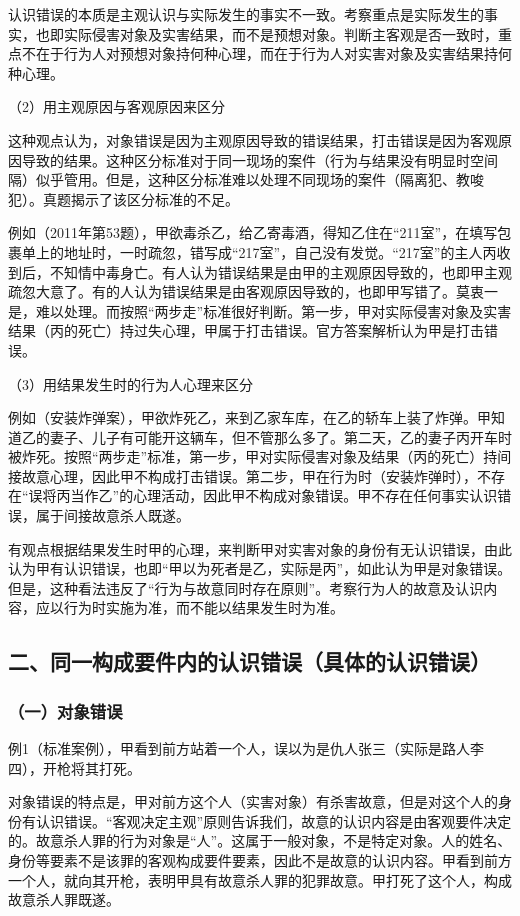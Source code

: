认识错误的本质是主观认识与实际发生的事实不一致。考察重点是实际发生的事实，也即实际侵害对象及实害结果，而不是预想对象。判断主客观是否一致时，重点不在于行为人对预想对象持何种心理，而在于行为人对实害对象及实害结果持何种心理。

（2）用主观原因与客观原因来区分

这种观点认为，对象错误是因为主观原因导致的错误结果，打击错误是因为客观原因导致的结果。这种区分标准对于同一现场的案件（行为与结果没有明显时空间隔）似乎管用。但是，这种区分标准难以处理不同现场的案件（隔离犯、教唆犯）。真题揭示了该区分标准的不足。

例如（2011年第53题），甲欲毒杀乙，给乙寄毒酒，得知乙住在“211室”，在填写包裹单上的地址时，一时疏忽，错写成“217室”，自己没有发觉。“217室”的主人丙收到后，不知情中毒身亡。有人认为错误结果是由甲的主观原因导致的，也即甲主观疏忽大意了。有的人认为错误结果是由客观原因导致的，也即甲写错了。莫衷一是，难以处理。而按照“两步走”标准很好判断。第一步，甲对实际侵害对象及实害结果（丙的死亡）持过失心理，甲属于打击错误。官方答案解析认为甲是打击错误。

（3）用结果发生时的行为人心理来区分

例如（安装炸弹案），甲欲炸死乙，来到乙家车库，在乙的轿车上装了炸弹。甲知道乙的妻子、儿子有可能开这辆车，但不管那么多了。第二天，乙的妻子丙开车时被炸死。按照“两步走”标准，第一步，甲对实际侵害对象及结果（丙的死亡）持间接故意心理，因此甲不构成打击错误。第二步，甲在行为时（安装炸弹时），不存在“误将丙当作乙”的心理活动，因此甲不构成对象错误。甲不存在任何事实认识错误，属于间接故意杀人既遂。

有观点根据结果发生时甲的心理，来判断甲对实害对象的身份有无认识错误，由此认为甲有认识错误，也即“甲以为死者是乙，实际是丙”，如此认为甲是对象错误。但是，这种看法违反了“行为与故意同时存在原则”。考察行为人的故意及认识内容，应以行为时实施为准，而不能以结果发生时为准。

\subsection*{二、同一构成要件内的认识错误（具体的认识错误）}

\subsubsection*{（一）对象错误}

例1（标准案例），甲看到前方站着一个人，误以为是仇人张三（实际是路人李四），开枪将其打死。

对象错误的特点是，甲对前方这个人（实害对象）有杀害故意，但是对这个人的身份有认识错误。“客观决定主观”原则告诉我们，故意的认识内容是由客观要件决定的。故意杀人罪的行为对象是“人”。这属于一般对象，不是特定对象。人的姓名、身份等要素不是该罪的客观构成要件要素，因此不是故意的认识内容。甲看到前方一个人，就向其开枪，表明甲具有故意杀人罪的犯罪故意。甲打死了这个人，构成故意杀人罪既遂。

